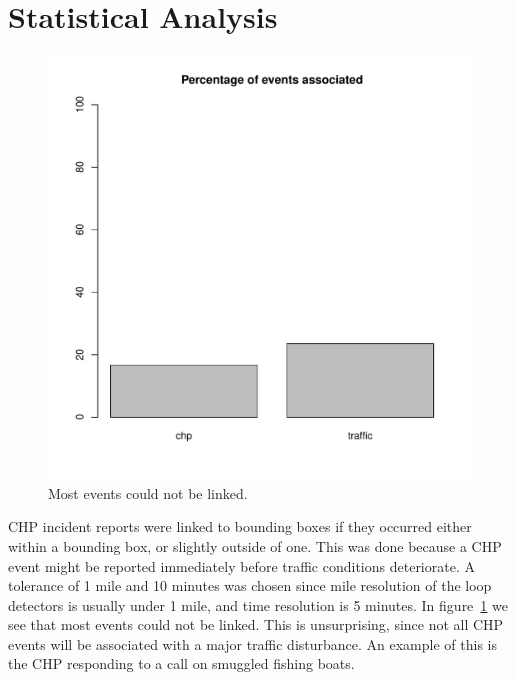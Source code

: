 \documentclass[12pt]{article}
\begin{document}
\section{Statistical Analysis}

\begin{figure}
    \label{fig:percent_events}
    \centering
    \includegraphics[scale=0.5]{../percent_events.pdf}
    \caption{Most events could not be linked.}
\end{figure}

CHP incident reports were linked to bounding boxes if they occurred either within
a bounding box, or slightly outside of one. This was done because a CHP
event might be reported immediately before traffic conditions deteriorate.
A tolerance of 1 mile and 10 minutes was chosen since mile resolution of
the loop detectors is
usually under 1 mile, and time resolution is 5 minutes. In
figure~\ref{fig:percent_events} we see that most events could not be
linked. This is unsurprising, since not all CHP events will be associated
with a major traffic disturbance. An example of this is the CHP responding
to a call on smuggled fishing boats. 
\end{document}
